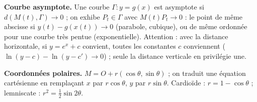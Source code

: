 \documentclass[a4paper,11pt]{article}
\numberwithin{equation}{section}
\numberwithin{figure}{section}
\numberwithin{table}{section}
\theoremstyle{enonce}
\theoremstyle{exemple}
\theoremstyle{remarque}
\begin{document}
\begin{horsprogramme}\label{hp:courbe-asymptote}
\textbf{Courbe asymptote.} Une courbe $\Gamma:y=g(x)$ est asymptote si $d(M(t),\Gamma)\to0$ ; on exhibe $P_t\in\Gamma$ avec
$M(t)P_t\to0$ : le point de même abscisse si $y(t)-g(x(t))\to0$ (parabole, cubique), ou de même ordonnée pour une courbe très
pentue (exponentielle). Attention : avec la distance horizontale, si $y=e^x+c$ convient, toutes les constantes $c$
conviennent ($\ln(y-c)-\ln(y-c')\to0$) ; seule la distance verticale en privilégie une.

\textbf{Coordonnées polaires.} $M=O+r(\cos\theta,\sin\theta)$ ; on traduit une équation cartésienne en remplaçant $x$ par
$r\cos\theta$, $y$ par $r\sin\theta$. Cardioïde : $r=1-\cos\theta$ ; lemniscate : $r^2=\frac12\sin2\theta$.
\end{horsprogramme}
\end{document}
